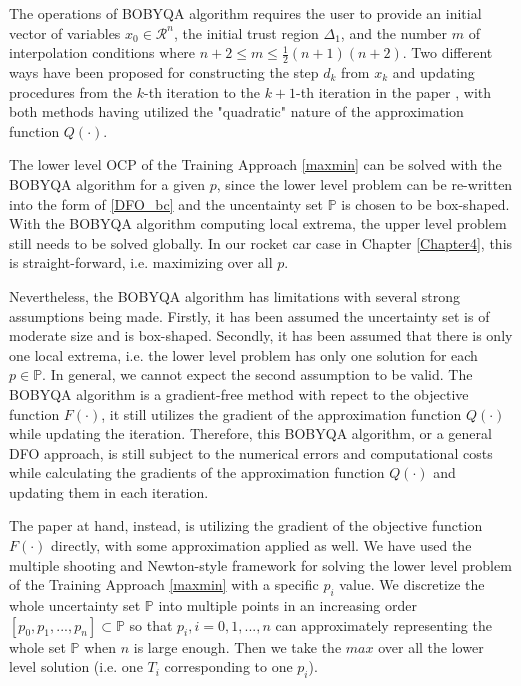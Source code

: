 \documentclass  [
  paper    = a4,
  BCOR     = 10mm,
  twoside,
  fontsize = 12pt,
  fleqn,
  toc      = bibnumbered,
  toc      = listofnumbered,
  numbers  = noendperiod,
  headings = normal,
  listof   = leveldown,
  version  = 3.03
]                                       {scrreprt}
\newcommand{\<}{\langle}
\renewcommand{\>}{\rangle}
\begin{document}
The operations of BOBYQA algorithm requires the user to provide an initial vector of variables $x_0 \in \mathcal{R}^n$, the initial trust region $\Delta_1$, and the number $m$ of interpolation conditions where $n+2 \leq m \leq \frac{1}{2}(n+1)(n+2)$. Two different ways have been proposed for constructing the step $d_k$ from $x_k$ and updating procedures from the $k$-th iteration to the $k+1$-th iteration in the paper \cite{MicPow09}, with both methods having utilized the "quadratic" nature of the approximation function $Q(\cdot)$.

The lower level OCP of the Training Approach \ref{maxmin} can be solved with the BOBYQA algorithm for a given $p$, since the lower level problem can be re-written into the form of \ref{DFO_bc} and the uncentainty set $\mathbb{P}$ is chosen to be box-shaped. With the BOBYQA algorithm computing local extrema, the upper level problem still needs to be solved globally. In our rocket car case in Chapter \ref{Chapter4}, this is straight-forward, i.e. maximizing over all $p$. 

Nevertheless, the BOBYQA algorithm has limitations with several strong assumptions being made. Firstly, it has been assumed the uncertainty set is of moderate size and is box-shaped. Secondly, it has been assumed that there is only one local extrema, i.e. the lower level problem has only one solution for each $p \in \mathbb{P}$. In general, we cannot expect the second assumption to be valid. The BOBYQA algorithm is a gradient-free method with repect to the objective function $F(\cdot)$, it still utilizes the gradient of the approximation function $Q(\cdot)$ while updating the iteration. Therefore, this BOBYQA algorithm, or a general DFO approach, is still subject to the numerical errors and computational costs while calculating the gradients of the approximation function $Q(\cdot)$  and updating them in each iteration.  

The paper at hand, instead, is utilizing the gradient of the objective function $F(\cdot)$ directly, with some approximation applied as well. We have used the multiple shooting and Newton-style framework for solving the lower level problem of the Training Approach \ref{maxmin} with a specific $p_i$ value. We discretize the whole uncertainty set  $\mathbb{P}$ into multiple points in an increasing order $[p_0, p_1, ..., p_n] \subset \mathbb{P}$ so that $p_i, i =0, 1, ..., n$ can approximately representing the whole set  $\mathbb{P}$ when $n$ is large enough. Then we take the $max$ over all the lower level solution (i.e. one $T_i$ corresponding to one $p_i$). 
\end{document}

